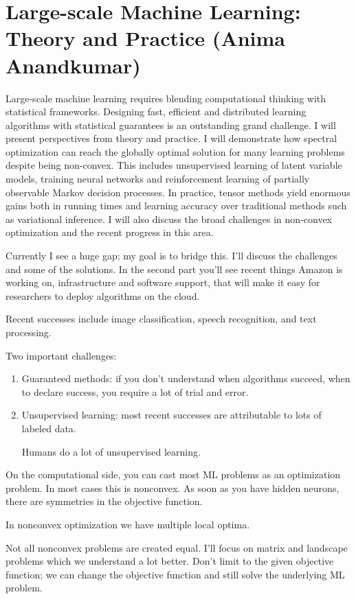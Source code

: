 \section{Large-scale Machine Learning: Theory and Practice (Anima Anandkumar)}

Large-scale machine learning requires blending computational thinking with statistical frameworks. Designing fast, efficient and distributed learning algorithms with statistical guarantees is an outstanding grand challenge. I will present perspectives from theory and practice. I will demonstrate how spectral optimization can reach the globally optimal solution for many learning problems despite being non-convex. This includes unsupervised learning of latent variable models, training neural networks and reinforcement learning of partially observable Markov decision processes.  In practice, tensor methods yield enormous gains both in running times and learning accuracy over traditional methods  such as variational inference. I will also discuss the broad challenges in non-convex optimization and the recent progress in this area.

Currently I see a huge gap; my goal is to bridge this. I'll discuss the challenges and some of the solutions. In the second part you'll see recent things Amazon is working on, infrastructure and software support,  that will make it easy for researchers to deploy algorithms on the cloud.

Recent successes include image classification, speech recognition, and text processing.

Two important challenges:
\begin{enumerate}
\item
Guaranteed methods: if you don't understand when algorithms succeed, when to declare success, you require a lot of trial and error.
\item
Unsupervised learning: most recent successes are attributable to lots of labeled data.

Humans do a lot of unsupervised learning.
\end{enumerate}
On the computational side, you can cast most ML problems as an optimization problem. In most cases this is nonconvex. As soon as you have hidden neurons, there are symmetries in the objective function.

In nonconvex optimization we have multiple local optima.

Not all nonconvex problems are created equal. I'll focus on matrix and landscape problems which we understand a lot better. 
Don't limit to the given objective function; we can change the objective function and still solve the underlying ML problem.


